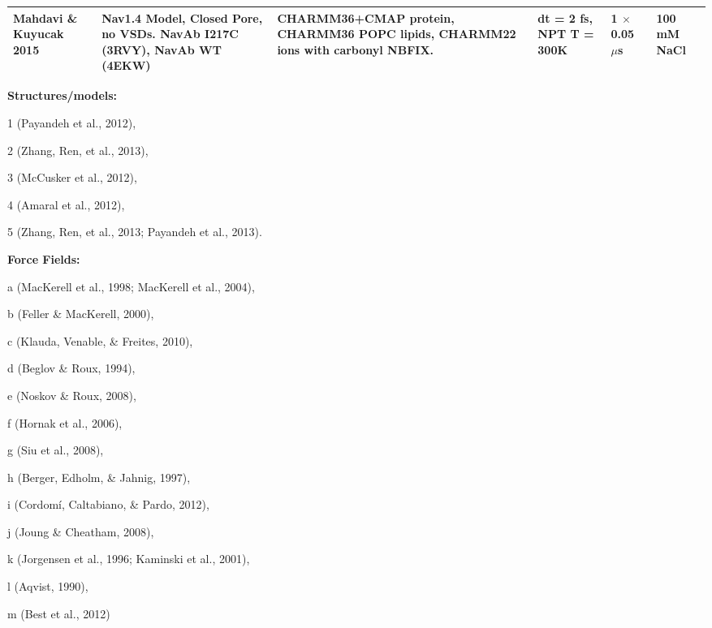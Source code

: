 \begin{refsection}
\begin{table}[]
\begin{threeparttable}
\begin{tabular}{ | p{1.5cm} | p{2.5cm} | p{3cm} | p{3cm} | p{2cm} | p{1cm} |}
Mahdavi \& Kuyucak 2015  & Nav1.4 Model, Closed Pore, no VSDs.  NavAb I217C (3RVY),\tnote{1} NavAb WT (4EKW)\tnote{5}                                        & CHARMM36+CMAP protein,\tnote{a,m} CHARMM36 POPC lipids,\tnote{c} CHARMM22 ions with carbonyl NBFIX.\tnote{d,e}                                                                & dt = 2 fs, NPT T = 300K                                        & 1 $\times$ 0.05 $\mu$s               & 100 mM NaCl               \\
\bottomrule
\end{tabular}
\begin{tablenotes}[para]
\item \textbf{Structures/models:} \item [1] (Payandeh et al., 2012), \item [2] (Zhang, Ren, et al., 2013), \item [3] (McCusker et al., 2012), \item [4] (Amaral et al., 2012), \item [5] (Zhang, Ren, et al., 2013; Payandeh et al., 2013). \item \textbf{Force Fields:} \item [a] (MacKerell et al., 1998; MacKerell et al., 2004), \item [b] (Feller \& MacKerell, 2000), \item [c] (Klauda, Venable, \& Freites, 2010), \item [d] (Beglov \& Roux, 1994), \item [e] (Noskov \& Roux, 2008), \item [f] (Hornak et al., 2006), \item [g] (Siu et al., 2008), \item [h] (Berger, Edholm, \& Jahnig, 1997), \item [i] (Cordom\'i, Caltabiano, \& Pardo, 2012), \item [j] (Joung \& Cheatham, 2008), \item [k] (Jorgensen et al., 1996; Kaminski et al., 2001), \item [l] (Aqvist, 1990), \item [m] (Best et al., 2012)
\end{tablenotes}
\end{threeparttable}
\end{table}



\end{refsection}
